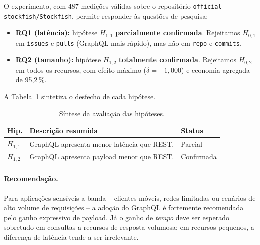 \documentclass[10pt,a4paper,twocolumn]{article}
\begin{document}
O experimento, com 487 medições válidas sobre o repositório
\texttt{official-stockfish/Stockfish}, permite responder às questões de
pesquisa:

\begin{itemize}
  \item \textbf{RQ1 (latência):} hipótese $H_{1,1}$
    \textbf{parcialmente confirmada}. Rejeitamos $H_{0,1}$ em \texttt{issues}
    e \texttt{pulls} (GraphQL mais rápido), mas não em \texttt{repo} e
    \texttt{commits}.
  \item \textbf{RQ2 (tamanho):} hipótese $H_{1,2}$
    \textbf{totalmente confirmada}. Rejeitamos $H_{0,2}$ em todos os recursos,
    com efeito máximo ($\delta=-1,000$) e economia agregada de 95,2\,\%.
\end{itemize}

A Tabela~\ref{tab:hipoteses} sintetiza o desfecho de cada hipótese.

\begin{table}[H]
  \centering
  \caption{Síntese da avaliação das hipóteses.}
  \label{tab:hipoteses}
  \small
  \begin{tabularx}{\columnwidth}{lXl}
    \toprule
    Hip. & Descrição resumida & Status \\
    \midrule
    $H_{1,1}$ & GraphQL apresenta menor latência que REST. & Parcial \\
    $H_{1,2}$ & GraphQL apresenta payload menor que REST. & Confirmada \\
    \bottomrule
  \end{tabularx}
\end{table}

\paragraph{Recomendação.} Para aplicações sensíveis a banda -- clientes
móveis, redes limitadas ou cenários de alto volume de requisições -- a adoção
do GraphQL é fortemente recomendada pelo ganho expressivo de payload. Já o
ganho de \emph{tempo} deve ser esperado sobretudo em consultas a recursos de
resposta volumosa; em recursos pequenos, a diferença de latência tende a ser
irrelevante.
\end{document}

